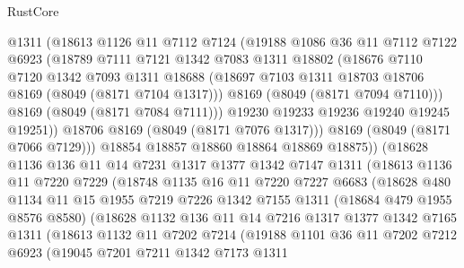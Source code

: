 \begin{lexlean}{RustCore}
\begin{coremodule}
              @1311
              (@18613
                @1126
                @11
                @7112
                @7124
                (@19188
                  @1086
                  @36
                  @11
                  @7112
                  @7122
                  @6923
                  (@18789
                    @7111
                    @7121
                    @1342
                    @7083
                    @1311
                    @18802
                    (@18676
                      @7110
                      @7120
                      @1342
                      @7093
                      @1311
                      @18688
                      (@18697 @7103 @1311 @18703 @18706 @8169 (@8049 (@8171 @7104 @1317)))
                      @8169
                      (@8049 (@8171 @7094 @7110)))
                    @8169
                    (@8049 (@8171 @7084 @7111)))
                  @19230
                  @19233
                  @19236
                  @19240
                  @19245
                  @19251))
              @18706
              @8169
              (@8049 (@8171 @7076 @1317)))
            @8169
            (@8049 (@8171 @7066 @7129)))
          @18854
          @18857
          @18860
          @18864
          @18869
          @18875))
      (@18628
        @1136
        @136
        @11
        @14
        @7231
        @1317
        @1377
        @1342
        @7147
        @1311
        (@18613
          @1136
          @11
          @7220
          @7229
          (@18748
            @1135
            @16
            @11
            @7220
            @7227
            @6683
            (@18628
              @480
              @1134
              @11
              @15
              @1955
              @7219
              @7226
              @1342
              @7155
              @1311
              (@18684 @479 @1955 @8576 @8580)
              (@18628
                @1132
                @136
                @11
                @14
                @7216
                @1317
                @1377
                @1342
                @7165
                @1311
                (@18613
                  @1132
                  @11
                  @7202
                  @7214
                  (@19188
                    @1101
                    @36
                    @11
                    @7202
                    @7212
                    @6923
                    (@19045
                      @7201
                      @7211
                      @1342
                      @7173
                      @1311

\end{coremodule}
\end{lexlean}
